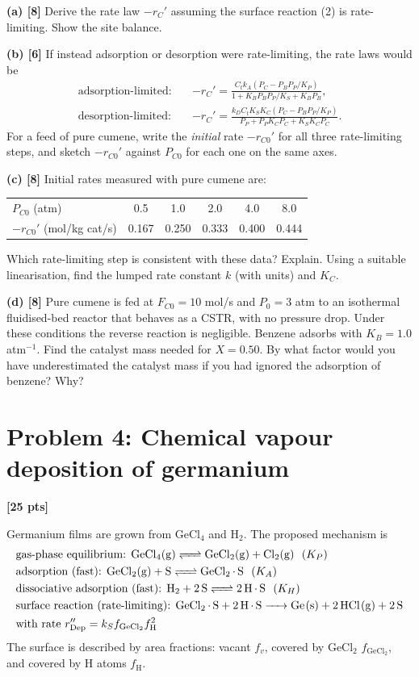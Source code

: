 \documentclass[11pt]{article}
\newcommand{\problem}[2]{\section*{Problem #1: #2}}
\newcommand{\pts}[1]{\hfill\textbf{[#1 pts]}}
\newcommand{\workspace}[1]{\par\vspace{#1}}
\begin{document}
\textbf{(a) [8]} Derive the rate law $-r_C'$ assuming the surface reaction (2) is rate-limiting. Show the site balance.
\workspace{7.5cm}

\textbf{(b) [6]} If instead adsorption or desorption were rate-limiting, the rate laws would be
\begin{align*}
\text{adsorption-limited:}\quad & -r_C'=\frac{C_tk_A\left(P_C-P_BP_P/K_P\right)}{1+K_BP_BP_P/K_S+K_BP_B},\\
\text{desorption-limited:}\quad & -r_C'=\frac{k_DC_tK_SK_C\left(P_C-P_BP_P/K_P\right)}{P_P+P_PK_CP_C+K_SK_CP_C}.
\end{align*}
For a feed of pure cumene, write the \emph{initial} rate $-r_{C0}'$ for all three rate-limiting steps, and sketch
$-r_{C0}'$ against $P_{C0}$ for each one on the same axes.
\workspace{5.5cm}

\newpage
\textbf{(c) [8]} Initial rates measured with pure cumene are:
\begin{center}
\renewcommand{\arraystretch}{1.3}
\begin{tabular}{lccccc}
\toprule
$P_{C0}$ (atm) & 0.5 & 1.0 & 2.0 & 4.0 & 8.0\\
$-r_{C0}'$ (mol/kg cat/s) & 0.167 & 0.250 & 0.333 & 0.400 & 0.444\\
\bottomrule
\end{tabular}
\end{center}
Which rate-limiting step is consistent with these data? Explain. Using a suitable linearisation, find the lumped rate
constant $k$ (with units) and $K_C$.
\workspace{7.5cm}

\textbf{(d) [8]} Pure cumene is fed at $F_{C0}=10$ mol/s and $P_0=3$ atm to an isothermal fluidised-bed reactor that behaves as a CSTR, with
no pressure drop. Under these conditions the reverse reaction is negligible. Benzene adsorbs with $K_B=1.0$ atm$^{-1}$.
Find the catalyst mass needed for $X=0.50$. By what factor would you have underestimated the catalyst mass if you had ignored
the adsorption of benzene? Why?
\workspace{7cm}

\newpage
\problem{4}{Chemical vapour deposition of germanium}\pts{25}

Germanium films are grown from GeCl$_4$ and H$_2$. The proposed mechanism is
\[
\begin{aligned}
&\text{gas-phase equilibrium: } \ce{GeCl4(g) <=> GeCl2(g) + Cl2(g)}\ \ (K_P)\\
&\text{adsorption (fast): } \ce{GeCl2(g) + S <=> GeCl2.S}\ \ (K_A)\\
&\text{dissociative adsorption (fast): } \ce{H2 + 2S <=> 2H.S}\ \ (K_H)\\
&\text{surface reaction (rate-limiting): } \ce{GeCl2.S + 2H.S -> Ge(s) + 2HCl(g) + 2S}\\
&\text{with rate } r''_{\text{Dep}}=k_Sf_{\mathrm{GeCl_2}}f_{\mathrm{H}}^2
\end{aligned}
\]
The surface is described by area fractions: vacant $f_v$, covered by GeCl$_2$ $f_{\mathrm{GeCl_2}}$, and covered by H atoms $f_{\mathrm{H}}$.
\end{document}
